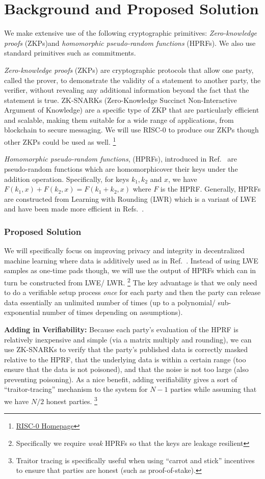\documentclass[11pt]{article}
\begin{document}
\section{Background and Proposed Solution}
We make extensive use of the following cryptographic primitives: \emph{Zero-knowledge proofs} (ZKPs)and \emph{homomorphic pseudo-random functions} (HPRFs).
We also use standard primitives such as commitments.

\emph{Zero-knowledge proofs} (ZKPs) are cryptographic protocols that allow one party, called the prover, to demonstrate the validity of a statement to another party, the verifier, without revealing any additional information beyond the fact that the statement is true. 
ZK-SNARKs (Zero-Knowledge Succinct Non-Interactive Argument of Knowledge) are a specific type of ZKP that are particularly efficient and scalable, making them suitable for a wide range of applications, from blockchain to secure messaging.
We will use RISC-0 to produce our ZKPs though other ZKPs could be used as well.
\footnote{\href{https://risczero.com/}{RISC-0 Homepage}}

\emph{Homomorphic pseudo-random functions}, (HPRFs), introduced in Ref.~\cite{boneh2013key} are pseudo-random functions which are homomorphicover their keys under the addition operation.
Specifically, for keys $k_1, k_2$ and $x$, we have $F(k_1, x) + F(k_2, x) = F(k_1 + k_2, x)$ where $F$ is the HPRF.
Generally, HPRFs are constructed from Learning with Rounding (LWR) which is a variant of LWE and have been made more efficient in Refs.~\cite{newKeyHom, kim2020key}.


\subsubsection*{Proposed Solution}
We will specifically focus on improving privacy and integrity in decentralized machine learning where data is additively used as in Ref.~\cite{stevens2021efficientdifferentiallyprivatesecure}.
Instead of using LWE samples as one-time pads though, we will use the output of HPRFs which can in turn be constructed from LWE/ LWR.
\footnote{Specifically we require \emph{weak} HPRFs so that the keys are leakage resilient}
The key advantage is that we only need to do a verifiable setup process \emph{once} for each party and then the party can release data essentially an unlimited number of times (up to a polynomial/ sub-exponential number of times depending on assumptions).

\textbf{Adding in Verifiability:} Because each party's evaluation of the HPRF is relatively inexpensive and simple (via a matrix multiply and rounding), we can use ZK-SNARKs to verify that the party's published data is correctly masked relative to the HPRF, that the underlying data is within a certain range (too ensure that the data is not poisoned), and that the noise is not too large (also preventing poisoning).
As a nice benefit, adding verifiability gives a sort of ``traitor-tracing'' mechanism to the system for $N - 1$ parties while assuming that we have $N /2$ honest parties.
\footnote{Traitor tracing is specifically useful when using ``carrot and stick'' incentives to ensure that parties are honest (such as proof-of-stake).}
\end{document}
